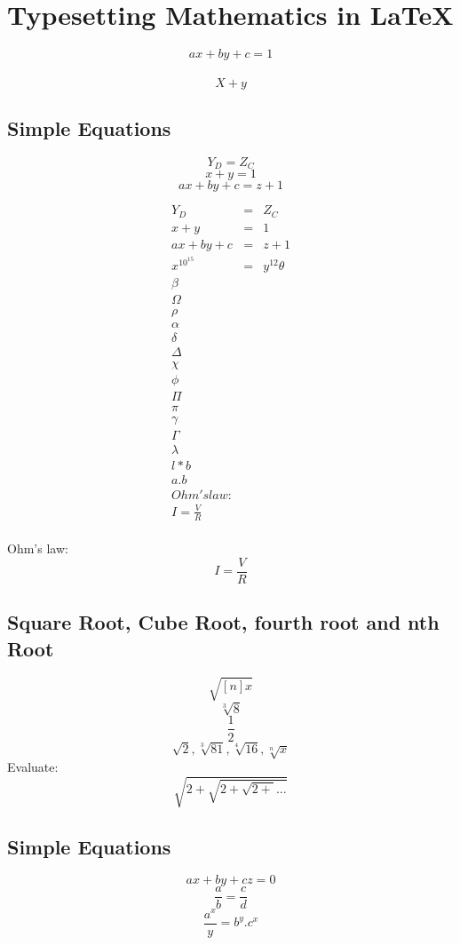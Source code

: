 \documentclass[12 pt,a4paper]{report}
\begin{document}
\chapter{Typesetting Mathematics in \LaTeX}
\begin{equation}
ax+by+c=1
\end{equation}\\
\begin{equation}
X+y
\end{equation}
\section{Simple Equations}
$$Y_{D}=Z_{C}$$
$$x+y=1$$
$$ax+by+c=z+1$$
\pagebreak
\begin{eqnarray*}
\\\\
Y_{D}&=&Z_{C}\\
x+y&=&1\\
ax+by+c&=&z+1\\
x^{10^{15}}&=&y^{12}
\theta\\
\beta\\
\Omega\\
\rho\\
\alpha\\
\delta\\
\Delta\\
\chi\\
\phi\\
\Pi\\
\pi\\
\gamma\\
\Gamma\\
\lambda\\
l*b\\
a.b\\
Ohm'slaw:\\
I=\frac{V}{R}
\end{eqnarray*}\\
Ohm's law:\\
$$I=\frac{V}{R}$$
\section{Square Root, Cube Root, fourth root and nth Root}
$$\sqrt{[n]x}$$
$$\sqrt[3]{8}$$
$$\frac{1}{2}$$
$$\sqrt{2},\sqrt[3]{81},\sqrt[4]{16},\sqrt[n]{x}$$
Evaluate:
$$\sqrt{2+\sqrt{2+\sqrt{2+}...}}$$
\section{Simple Equations}
$$ax+by+cz=0$$
$$\frac{a}{b}=\frac{c}{d}$$
$$\frac{a^{x}}{y}=b^{y}.c^{x}$$
\end{document}
